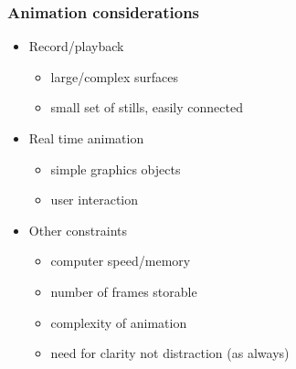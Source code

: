 \subsubsection{Animation considerations}
\begin{itemize}
	\item Record/playback
	\begin{itemize}
		\item large/complex surfaces
		\item small set of stills, easily connected
	\end{itemize}
	\item Real time animation
	\begin{itemize}
		\item simple graphics objects
		\item user interaction
	\end{itemize}
	\item Other constraints
	\begin{itemize}
		\item computer speed/memory
		\item number of frames storable
		\item complexity of animation
		\item need for clarity not distraction (as always)
	\end{itemize}	
\end{itemize}

